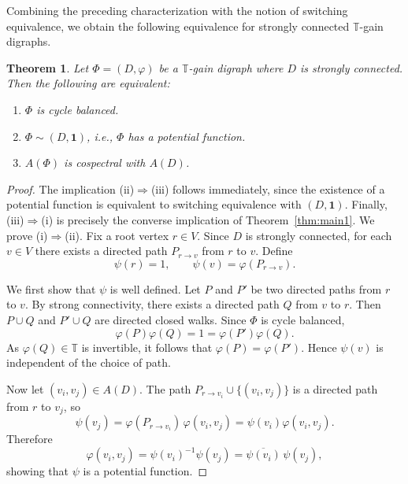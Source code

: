\documentclass[12pt]{article}
\newtheorem{theorem}{Theorem}[section]
\theoremstyle{definition}
\newcommand{\TT}{\mathbb{T}}
\newcommand{\vp}{\varphi}
\begin{document}
Combining the preceding characterization with the notion of switching equivalence, we obtain the following equivalence for strongly connected $\TT$-gain digraphs.

\begin{theorem}
  \label{thm:main2}
  Let $\Phi = (D, \vp)$ be a $\TT$-gain digraph where $D$ is strongly
  connected. Then the following are equivalent:
  \begin{enumerate}[label=\textnormal{(\roman*)}]
    \item $\Phi$ is cycle balanced.
    \item $\Phi \sim (D, \mathbf{1})$, i.e., $\Phi$ has a potential function.
    \item $A(\Phi)$ is cospectral with $A(D)$.
  \end{enumerate}
\end{theorem}
\begin{proof}
The implication \textnormal{(ii)}$\Rightarrow$\textnormal{(iii)} follows immediately, since the existence of a potential function is equivalent to switching equivalence with $(D,\mathbf{1})$. Finally,
\textnormal{(iii)}$\Rightarrow$\textnormal{(i)} is precisely the converse implication of Theorem~\ref{thm:main1}. We prove \textnormal{(i)}$\Rightarrow$\textnormal{(ii)}. Fix a root vertex
$r\in V$. Since $D$ is strongly connected, for each $v\in V$ there exists a directed path $P_{r\to v}$ from $r$ to $v$. Define
\[
\psi(r)=1,\qquad
\psi(v)=\vp(P_{r\to v}).
\]

We first show that $\psi$ is well defined. Let $P$ and $P'$ be two directed paths from $r$ to $v$. By strong connectivity, there exists a directed path $Q$ from $v$ to $r$. Then $P\cup Q$ and $P'\cup Q$ are directed closed walks. Since $\Phi$ is cycle balanced,
\[
\vp(P)\vp(Q)=1=\vp(P')\vp(Q).
\]
As $\vp(Q)\in\TT$ is invertible, it follows that
$\vp(P)=\vp(P')$. Hence $\psi(v)$ is independent of the choice of path.

Now let $(v_i,v_j)\in A(D)$. The path
$P_{r\to v_i}\cup\{(v_i,v_j)\}$ is a directed path from $r$ to $v_j$, so
\[
\psi(v_j)
=\vp(P_{r\to v_i})\,\vp(v_i,v_j)
=\psi(v_i)\vp(v_i,v_j).
\]
Therefore
\[
\vp(v_i,v_j)
=\psi(v_i)^{-1}\psi(v_j)
=\overline{\psi(v_i)}\,\psi(v_j),
\]
showing that $\psi$ is a potential function.
\end{proof}
\end{document}

